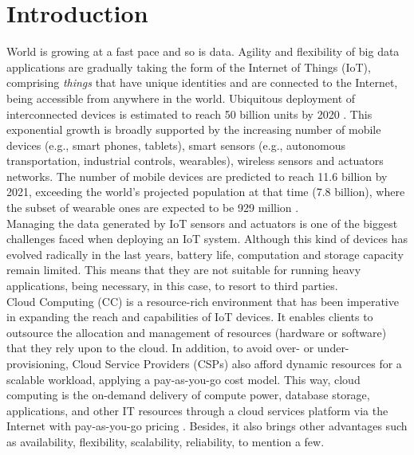 \chapter{Introduction}\label{sec:Introduction}
World is growing at a fast pace and so is data. Agility and flexibility of big data applications are gradually taking the form of the Internet of Things (IoT), comprising \textit{things} that have unique identities and are connected to the Internet, being accessible from anywhere in the world. Ubiquitous deployment of interconnected devices is estimated to reach 50 billion units by 2020 \cite{evans2011internet}. This exponential growth is broadly supported by the increasing number of mobile devices (e.g., smart phones, tablets), smart sensors (e.g., autonomous transportation, industrial controls, wearables), wireless sensors and actuators networks. The number of mobile devices are predicted to reach 11.6 billion by 2021, exceeding the world’s projected population at that time (7.8 billion), where the subset of wearable ones are expected to be 929 million \cite{CiscoVis16:online}.\\
\noindent\tab Managing the data generated by IoT sensors and actuators is one of the biggest challenges faced when deploying an IoT system. Although this kind of devices has evolved radically in the last years, battery life, computation and storage capacity remain limited. This means that they are not suitable for running heavy applications, being necessary, in this case, to resort to third parties.\\
\noindent\tab Cloud Computing (CC) is a resource-rich environment that has been imperative in expanding the reach and capabilities of IoT devices. It enables clients to outsource the allocation and management of resources (hardware or software) that they rely upon to the cloud. In addition, to avoid over- or under-provisioning, Cloud Service Providers (CSPs) also afford dynamic resources for a scalable workload, applying a pay-as-you-go cost model. This way, cloud computing is the on-demand delivery of compute power, database storage, applications, and other IT resources through a cloud services platform via the Internet with pay-as-you-go pricing \cite{WhatisCl79:online}. Besides, it also brings other advantages such as availability, flexibility, scalability, reliability, to mention a few.\\
